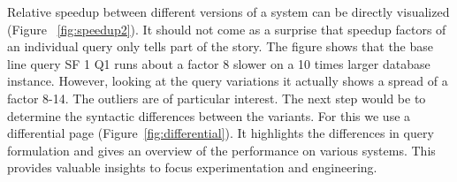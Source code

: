 \documentclass{cidr-2019}
\begin{document}
Relative speedup between different versions of a system can be
directly visualized (Figure ~\ref{fig:speedup2}). It should not come
as a surprise that speedup factors of an individual query only tells
part of the story. The figure shows that the base line query SF 1
Q1  runs about a factor 8
slower on a 10 times larger database instance.  However, looking at
the query variations it actually shows a spread of a factor 8-14. The
outliers are of particular interest. The next step would be to
determine the syntactic differences between the variants. For this we
use a differential page (Figure~\ref{fig:differential}). It highlights
the differences in query formulation and gives an overview of the
performance on various systems. This provides valuable insights to
focus experimentation and engineering.




\end{document}
